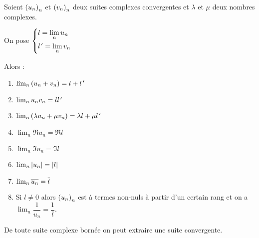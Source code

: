 \begin{prop}
Soient \(\left(u_n\right)_n\) et \(\left(v_n\right)_n\) deux suites complexes convergentes et \(\lambda\) et \(\mu\) deux nombres complexes.

On pose \(\begin{dcases}l=\lim_nu_n \\ l^{\,\prime}=\lim_nv_n\end{dcases}\)

Alors :

\begin{enumerate}
\item \(\lim_n\left(u_n+v_n\right)=l+l^{\,\prime}\) \\

\item \(\lim_nu_nv_n=ll^{\,\prime}\) \\

\item \(\lim_n\left(\lambda u_n+\mu v_n\right)=\lambda l+\mu l^{\,\prime}\) \\

\item \(\lim_n\Re u_n=\Re l\) \\

\item \(\lim_n\Im u_n=\Im l\) \\

\item \(\lim_n\left\lvert u_n\right\rvert=\left\lvert l\right\rvert\) \\

\item \(\lim_n\overline{u_n}=\overline{l}\) \\

\item Si \(l\not=0\) alors \(\left(u_n\right)_n\) est à termes non-nuls à partir d'un certain rang et on a \(\lim_n\dfrac{1}{u_n}=\dfrac{1}{l}\). \\
\end{enumerate}
\end{prop}

\begin{dem}
\end{dem}

\begin{theo}
De toute suite complexe bornée on peut extraire une suite convergente.
\end{theo}

